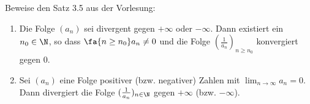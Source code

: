 \begin{prob}
  Beweise den Satz 3.5 aus der Vorlesung:
  \begin{enumerate}[label=(\alph*)]
  \item Die Folge $(a_n)$ sei divergent gegen $+\infty$ oder $-\infty$. Dann
    existiert ein $n_0 \in \N$, so dass $\fa{n \geq n_0} a_n \neq 0$ und die
    Folge $\left( \frac{1}{a_n} \right)_{n \geq n_0}$ konvergiert gegen $0$.
  \item Sei $(a_n)$ eine Folge positiver (bzw. negativer) Zahlen mit
    $\lim_{n \to \infty} a_n = 0$. Dann divergiert die Folge
    $(\frac{1}{a_n})_{n \in \N}$ gegen $+\infty$ (bzw. $-\infty$).
  \end{enumerate}
\end{prob}
